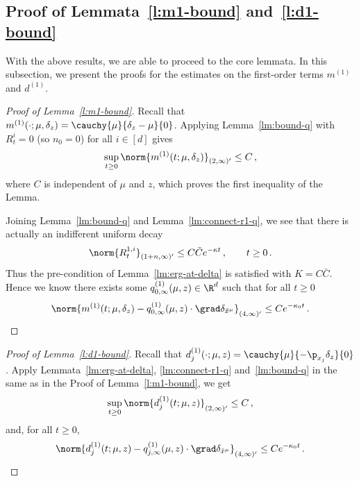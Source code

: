 \documentclass{amsart}
\begin{document}
\subsection{Proof of Lemmata~\ref{l:m1-bound} and~\ref{l:d1-bound}}
\label{s:prf-1st-order}

With the above results, we are able to proceed to the core lemmata.
In this subsection, we present the proofs for the estimates on the first-order terms $m^{(1)}$ and $d^{(1)}$.

\begin{proof}[Proof of Lemma~\ref{l:m1-bound}]
	Recall that $m^{(1)}(\cdot;\mu,\delta_z) = \cauchy{\mu}{\delta_z - \mu}{0}$.
	Applying Lemma~\ref{lm:bound-q} with $R^i_t = 0$ (so $n_0=0$) for all $i \in [d]$ gives 
	\begin{equation*}
		\sup_{t \ge 0} \norm{m^{(1)}(t;\mu,\delta_z)}_{(2,\infty)'} \le C \,,
	\end{equation*}
	where $C$ is independent of $\mu$ and $z$, which proves the first inequality of the Lemma. 

	Joining Lemma~\ref{lm:bound-q} and Lemma~\ref{lm:connect-r1-q}, we see that there is actually an indifferent uniform decay 
	\begin{equation*}
		\norm{R^{1,i}_t}_{(1+n,\infty)'}  \le C \bar C e^{-\kappa t} \,, \qquad t \ge 0 \,.
	\end{equation*}
	Thus the pre-condition of Lemma~\ref{lm:erg-at-delta} is satisfied with $K = C \bar C$. 
	Hence we know there exists some $q^{(1)}_{0,\infty}(\mu,z) \in \R^d$ such that for all $t \ge 0$
	\begin{equation*}
		\norm{ m^{(1)}(t;\mu,\delta_z) - q^{(1)}_{0,\infty}(\mu,z) \cdot \grad \delta_{\tilde x^\mu} }_{(4,\infty)'} \le C e^{-\kappa_0 t} \,.
	\end{equation*}
\end{proof}

\begin{proof}[Proof of Lemma~\ref{l:d1-bound}]
	Recall that $d^{(1)}_j(\cdot;\mu,z) = \cauchy{\mu}{-\p_{x_j} \delta_z}{0}$.
	Apply Lemmata~\ref{lm:erg-at-delta}, \ref{lm:connect-r1-q} and~\ref{lm:bound-q} in the same as in the Proof of Lemma~\ref{l:m1-bound}, we get 
	\begin{equation*}
		\sup_{t \ge 0} \norm{d^{(1)}_j(t;\mu,z)}_{(2,\infty)'} \le C \,,
	\end{equation*}
	and, for all $t \ge 0$,
	\begin{equation*}
		\norm{ d^{(1)}_j(t;\mu,z) - q^{(1)}_{j,\infty}(\mu,z) \cdot \grad \delta_{\tilde x^\mu} }_{(4,\infty)'} \le C e^{-\kappa_0 t} \,.
	\end{equation*}
\end{proof}
\end{document}
